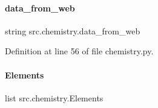 \paragraph{\texorpdfstring{data\+\_\+from\+\_\+web}{data\_from\_web}}
{\footnotesize\ttfamily string src.\+chemistry.\+data\+\_\+from\+\_\+web}



Definition at line 56 of file chemistry.\+py.

\mbox{\label{namespacesrc_1_1chemistry_ae63d9e3b53970a3c7ba82b78970cb7e2}} 
\paragraph{\texorpdfstring{Elements}{Elements}}
{\footnotesize\ttfamily list src.\+chemistry.\+Elements}

